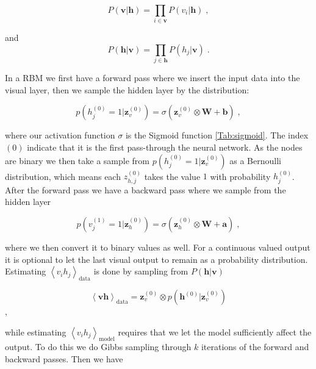 \begin{equation}
    P(\boldsymbol{v} | \boldsymbol{h} ) = \prod_{i \in \boldsymbol{v}} P(v_i | \boldsymbol{h} ) \; , 
\end{equation}

and
\begin{equation}
    P(\boldsymbol{h} | \boldsymbol{v} ) = \prod_{j \in \boldsymbol{h}} P(h_j | \boldsymbol{v} ) \; .
\end{equation}

In a RBM we first have a forward pass where we insert the input data into the visual layer, then we sample the hidden layer by the distribution:

\begin{equation}
    p(h_j^{(0)} = 1 | \boldsymbol{z}_{v}^{(0)}) = \sigma\left (\boldsymbol{z}_{v}^{(0)} \otimes \boldsymbol{W} + \boldsymbol{b} \right ) \; , 
\end{equation}

where our activation function $\sigma$ is the Sigmoid function \ref{Tab:sigmoid}. The index $(0)$ indicate that it is the first pass-through the neural network. As the nodes are binary we then take a sample from $p(h_j^{(0)}=1 | \boldsymbol{z}_v^{(0)} )$ as a Bernoulli distribution, which means each $z_{h, j}^{(0)}$ takes the value $1$ with probability $h_j^{(0)}$. After the forward pass we have a backward pass where we sample from the hidden layer

\begin{equation}
    p(v_j^{(1)} = 1 | \boldsymbol{z}_{h}^{(0)}) = \sigma\left (\boldsymbol{z}_{h}^{(0)} \otimes \boldsymbol{W} + \boldsymbol{a} \right ) \; , 
\end{equation}

where we then convert it to binary values as well. For a continuous valued output it is optional to let the last visual output to remain as a probability distribution. Estimating $\left < v_i h_j \right >_{\text{data}}$ is done by sampling from $P(\boldsymbol{h} | \boldsymbol{v} )$

\begin{equation}
    \left < \boldsymbol{v} \boldsymbol{h} \right >_{\text{data}} = \boldsymbol{z}_v^{(0)} \otimes p(\boldsymbol{h}^{(0)} | \boldsymbol{z}_{v}^{(0)})
\end{equation} \; ,

while estimating $ \left < v_i h_j \right >_{\text{model}}$ requires that we let the model sufficiently affect the output. To do this we do Gibbs sampling through $k$ iterations of the forward and backward passes. Then we have

